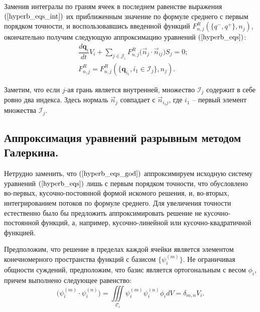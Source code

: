 \documentclass[14pt, a4paper, fleqn]{extreport}
\begin{document}
	Заменив интегралы по граням ячеек в последнем равенстве выражения $(\ref{hyperb_eqs_int})$ 
	их приближенным значение по формуле среднего с первым порядком точности,
	и воспользовавшись введенной функций $F_{n,j}^R(\lbrace q^{-}, q^{+} \rbrace, n_j)$,
	окончательно получим следующую аппроксимацию уравнений $(\ref{hyperb_eqs})$:
	\begin{equation}
	\label{hyperb_eqs_god} \boxed{
	\begin{split}
		&\dfrac{d \textbf{q}_i}{d t}V_i
			+ \sum\limits_{j \in \mathcal{J}_i} F_{n,j}^R \Big( \vec{n}_{j} \cdot \vec{n}_{ij} \Big) S_j = 0;
		\\
		&F_{n,j}^R = F_{n,j}^R(\lbrace \textbf{q}_{i_1}, i_1 \in \mathcal{I}_j \rbrace, n_{j}).
	\end{split}}
	\end{equation}
	
	Заметим, что если $j$-ая грань является внутренней, множество $\mathcal{I}_j$ содержит в себе ровно два индекса.
	Здесь нормаль $\vec{n}_j$ совпадает с $\vec{n}_{i_1 j}$, где $i_1$ -- первый элемент множества $\mathcal{I}_j$.
	
	\subsection{Аппроксимация уравнений разрывным методом Галеркина.}

	Нетрудно заменить, что $(\ref{hyperb_eqs_god})$ аппроксимируем исходную систему 
	уравнений $(\ref{hyperb_eqs})$ лишь с первым порядком точности,
	что обусловлено во-первых, кусочно-постоянной формой искомого решения, и, во-вторых, интегрированием потоков по формуле среднего.
	Для увеличения точности естественно было бы предложить аппроксимировать решение не кусочно-постоянной функций,
	а, например, кусочно-линейной или кусочно-квадратичной функцией.
	
	Предположим, что решение в пределах каждой ячейки является элементом
	конечномерного пространства функций с базисом ${\lbrace \psi_i^{(m)} \rbrace}$.
	Не ограничивая общности суждений, предположим, что базис является ортогональным с весом $\phi_i$, причем 
	выполнено следующее равенство:
	\begin{equation}
	\label{basis_cond}
		\Big(\psi_i^{(m)} \cdot \psi_i^{(n)} \Big)
			= \iiint\limits_{\mathcal{C}_i} \psi_i^{(m)} \psi_i^{(n)} \phi_i dV
			= \delta_{m,n} V_i.
	\end{equation}
	
\end{document}
